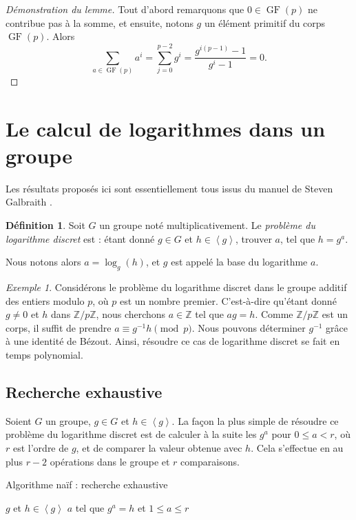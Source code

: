 \documentclass[a4paper, titlepage]{article}
\theoremstyle{definition}
\newtheorem{defi}[theo]{Définition}
\theoremstyle{remark}
\newtheorem{exem}[theo]{Exemple}
\def\Z{\mathbb Z}
\def\gf{\operatorname{GF}}
\def\gen #1{\left\langle#1\right\rangle}
\begin{document}
\begin{proof}[Démonstration du lemme]
Tout d'abord remarquons que $0 \in \gf(p)$ ne contribue pas à la somme, et ensuite, notons $g$ un élément primitif du corps $\gf(p)$. Alors
$$\sum_{a\in\gf(p)} a^i = \sum_{j=0}^{p-2} g^i = \frac{g^{i(p-1)} - 1}{g^{i} - 1} = 0.$$
\end{proof}

\section{Le calcul de logarithmes dans un groupe}\label{logDiscret}

Les résultats proposés ici sont essentiellement tous issus du manuel de Steven Galbraith \cite[section 13 et 14, pp. 246 à 297]{galbraith2012}.

\begin{defi}\label{defLogDiscret}
Soit $G$ un groupe noté multiplicativement. Le \textit{problème du logarithme discret} est : étant donné $g\in G$ et $h \in \gen{g}$, trouver $a$, tel que $h=g^a$.\end{defi}
Nous notons alors $a=\log_g(h)$, et $g$ est appelé la base du logarithme $a$.


\begin{exem}
Considérons le problème du logarithme discret dans le groupe additif des entiers modulo $p$, où $p$ est un nombre premier. C'est-à-dire qu'étant donné $g \neq 0$ et $h$ dans $\Z/p\Z$, nous cherchons $a \in \Z$ tel que $ag = h$. Comme $\Z/p\Z$ est un corps, il suffit de prendre $a \equiv g^{-1}h \pmod{p}$. Nous pouvons déterminer $g^{-1}$ grâce à une identité de Bézout. Ainsi, résoudre ce cas de logarithme discret se fait en temps polynomial.
\end{exem}

\subsection{Recherche exhaustive}

Soient $G$ un groupe, $g\in G$ et $h \in \gen{g}$. La façon la plus simple de résoudre ce problème du logarithme discret est de calculer à la suite les $g^a$ pour $0 \leqslant a < r$, où $r$ est l'ordre de $g$, et de comparer la valeur obtenue avec $h$. Cela s'effectue en au plus $r - 2$ opérations dans le groupe et $r$ comparaisons.

\begin{algorithm}[h]
\caption{Algorithme naïf : recherche exhaustive}
\label{algoLogDiscretNaif}
\begin{algorithmic}[1]
\REQUIRE $g$ et $h \in \gen{g}$
\ENSURE $a$ tel que $g^a = h$ et $1 \leqslant a \leqslant r$
\ENDWHILE
{}
\end{algorithmic}
\end{algorithm}
\end{document}
